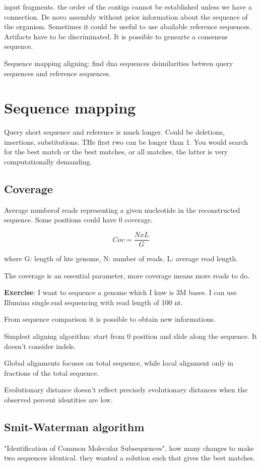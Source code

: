 input fragments. the order of the contigs cannot be established unless we have a connection. De novo assembly without prior information about the sequence of the organism. Sometimes it could be useful to use abailable reference sequences. Artifacts have to be discriminated.
It is possible to genearte a consensus sequence.

Sequence mapping aligning: find dna sequences dsimilarities betwen query sequences and reference sequences.

\section{Sequence mapping}
Query short sequence and reference is much longer. Could be deletions, insertions, substitutions. THe first rwo can be longer than 1. You would search for the best match or the best matches, or all matches, the latter is very computationally demanding.

\subsection{Coverage}
Average numberof reads representing a given nucleotide in the reconstructed sequence. Some positions could have 0 coverage.

$$Cov = \frac{N x L}{G}$$

where G: length of hte genome, N: number of reads, L: average read length.

The coverage  is an essential parameter, more coverage means more reads to do.


\textbf{Exercise}:
I want to sequence a genome which I knw is 3M bases. I can use Illumina single.end sequencing with read length of 100 nt.

From sequence comparison it is possible to obtain new informations.


Simplest aligning algorithm: start from 0 position and slide along the sequence. It doesn't consider indels.

Global alignments focuses on total sequence, while local alignment only in fractions of the total sequence.

Evolutionary distance doesn't reflect precisely evolutionary distances when the observed percent identities are low.


\subsection{Smit-Waterman algorithm}
"Identification of Common Molecular Subsequences", how many changes to make two sequences identical. they wanted a solution such that gives the best matches.

